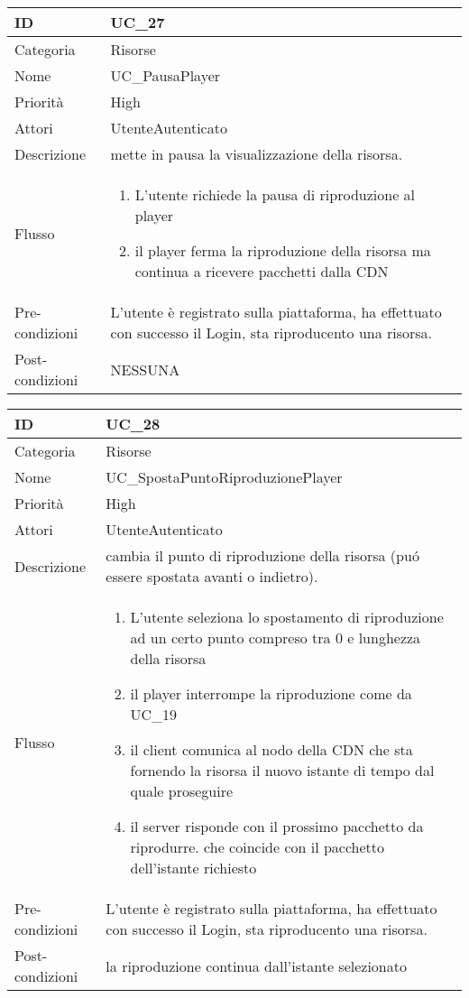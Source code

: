 \begin{center}
\begin{tabular}{ |p{2cm}|p{13cm}|  }
\hline
ID & UC\_27 \\\hline
Categoria & Risorse\\\hline
Nome & UC\_PausaPlayer\\\hline
Priorità & High \\\hline
Attori &  UtenteAutenticato \\\hline
Descrizione & mette in pausa la visualizzazione della risorsa.\\\hline
Flusso &  	\begin{enumerate}
			\item L'utente richiede la pausa di riproduzione al player
			\item il player ferma la riproduzione della risorsa ma continua a ricevere pacchetti dalla CDN 
			\end{enumerate}
			\\\hline
Pre-condizioni & L'utente è registrato sulla piattaforma, ha effettuato con successo il Login, sta riproducento una risorsa.\\\hline
Post-condizioni & NESSUNA\\\hline
\end{tabular}
\label{table_use_case:27}\newline

\begin{tabular}{ |p{2cm}|p{13cm}|  }
\hline
ID & UC\_28 \\\hline
Categoria & Risorse\\\hline
Nome & UC\_SpostaPuntoRiproduzionePlayer\\\hline
Priorità & High \\\hline
Attori &  UtenteAutenticato \\\hline
Descrizione & cambia il punto di riproduzione della risorsa (pu\'o essere spostata avanti o indietro).\\\hline
Flusso &  	\begin{enumerate}
			\item L'utente seleziona lo spostamento di riproduzione ad un certo punto compreso tra 0 e lunghezza della risorsa
			\item il player interrompe la riproduzione come da UC\_19
			\item il client comunica al nodo della CDN che sta fornendo la risorsa il nuovo istante di tempo dal quale proseguire
			\item il server risponde con il prossimo pacchetto da riprodurre. che coincide con il pacchetto dell'istante richiesto
		\end{enumerate}
			\\\hline
Pre-condizioni & L'utente è registrato sulla piattaforma, ha effettuato con successo il Login, sta riproducento una risorsa.\\\hline
Post-condizioni & la riproduzione continua dall'istante selezionato\\\hline
\end{tabular}
\label{table_use_case:28}\newline



\end{center}
